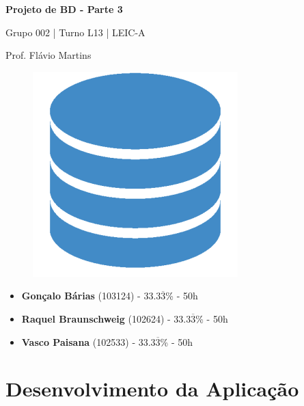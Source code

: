 \documentclass[12pt,a4paper]{article}
\begin{document}
\begin{titlepage}
  \begin{center}
    \vspace*{5cm}
    \Huge
    \textbf{Projeto de BD - Parte 3}

    \vspace{0.5cm}
    \LARGE
    Grupo 002 | Turno L13 | LEIC-A

    \vspace{0.5cm}
    \large
    Prof. Flávio Martins

    \vspace{0.5cm}
    \begin{figure}[h]
      \centering
      \includegraphics[scale=0.5]{report_logo.png}
    \end{figure}

    \vfill
    \large
    \begin{minipage}{0.8\textwidth}
      \begin{itemize}
        \item[] \textbf{Gonçalo Bárias} (103124) - 33.3$\overline{3}$\% - 50h
        \item[] \textbf{Raquel Braunschweig} (102624) - 33.3$\overline{3}$\% - 50h
        \item[] \textbf{Vasco Paisana} (102533) - 33.3$\overline{3}$\% - 50h
      \end{itemize}
    \end{minipage}
  \end{center}
\end{titlepage}

\section*{Desenvolvimento da Aplicação}
\end{document}
